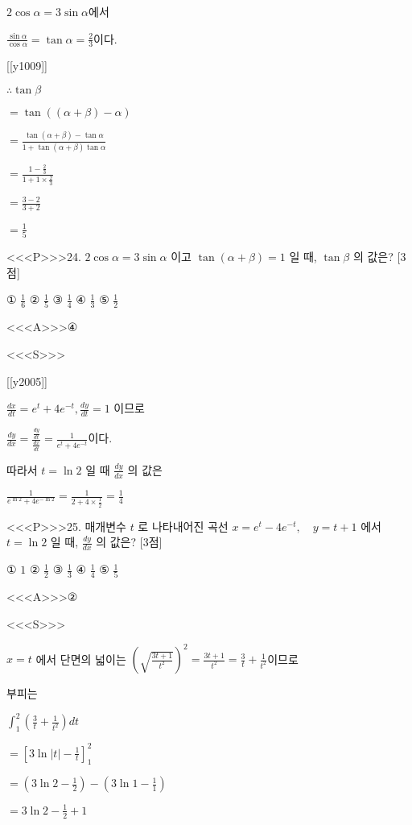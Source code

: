 \documentclass{oblivoir}
\begin{document}
$ 2 \cos \alpha =3 \sin \alpha$에서 

$\frac{\sin \alpha}{\cos \alpha}=\tan \alpha=\frac{2}{3}$이다.

[[y1009]]

$\therefore \tan \beta$

$=\tan ((\alpha+\beta)-\alpha)$

$=\frac{\tan (\alpha+\beta)-\tan \alpha}{1+\tan (\alpha+\beta) \tan \alpha}$

$= \frac{1-\frac{2}{3}}{1+1 \times \frac{2}{3}}$

$=\frac{3-2}{3+2}$

$=\frac{1}{5} $


<<<P>>>24. $2 \cos \alpha=3 \sin \alpha$ 이고 $\tan (\alpha+\beta)=1$ 일 때, $\tan \beta$ 의 값은?
[3점]

① $\frac{1}{6}$
② $\frac{1}{5}$
③ $\frac{1}{4}$
④ $\frac{1}{3}$
⑤ $\frac{1}{2}$


<<<A>>>④

<<<S>>>

[[y2005]]

$ \frac{d x}{d t}=e^{t}+4 e^{-t}, \frac{d y}{d t}=1$ 이므로

$\frac{d y}{d x}=\frac{\frac{d y}{d t}}{\frac{d x}{d t}}=\frac{1}{e^{t}+4 e^{-t}}$이다.

따라서 $t=\ln 2$ 일 때 $\frac{d y}{d x}$ 의 값은

$\frac{1}{e^{\ln 2}+4 e^{-\ln 2}}=\frac{1}{2+4 \times \frac{1}{2}}=\frac{1}{4}
$


<<<P>>>25. 매개변수 $t$ 로 나타내어진 곡선
$ x=e^{t}-4 e^{-t}, \quad y=t+1 $
에서 $t=\ln 2$ 일 때, $\frac{d y}{d x}$ 의 값은? [3점]

① $1$
② $\frac{1}{2}$
③ $\frac{1}{3}$
④ $\frac{1}{4}$
⑤ $\frac{1}{5}$



<<<A>>>②

<<<S>>>



$x=t$ 에서 단면의 넓이는
$\left(\sqrt{\frac{3 t+1}{t^{2}}}\right)^{2}=\frac{3 t+1}{t^{2}}=\frac{3}{t}+\frac{1}{t^{2}}$이므로

부피는

$\int_{1}^{2}\left(\frac{3}{t}+\frac{1}{t^{2}}\right) d t $

$=\left[3 \ln |t|-\frac{1}{t}\right]_{1}^{2}$

$=\left(3 \ln 2-\frac{1}{2}\right)-\left(3 \ln 1-\frac{1}{1}\right)$

$=3 \ln 2-\frac{1}{2}+1$
\end{document}
